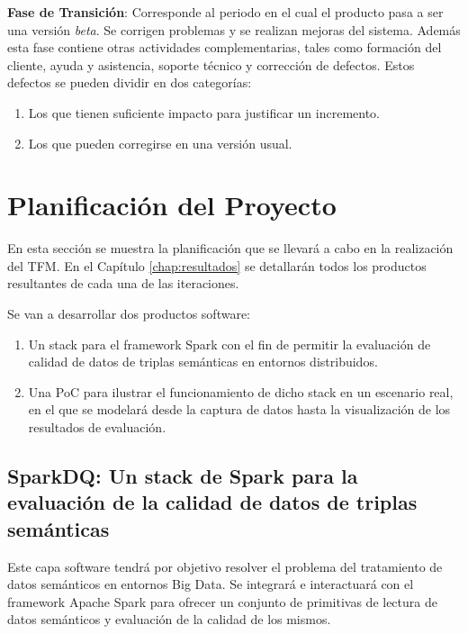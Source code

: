 \textbf{Fase de Transición}: Corresponde al periodo en el cual el producto pasa
a ser una versión \textit{beta}. Se corrigen problemas y se realizan mejoras del
sistema. Además esta fase contiene otras actividades complementarias, tales
como formación del cliente, ayuda y asistencia, soporte técnico y corrección de
defectos. Estos defectos se pueden dividir en dos categorías: 

\begin{enumerate}
\item Los que tienen suficiente impacto para justificar un incremento. 
\item Los que pueden corregirse en una versión usual. 
\end{enumerate}



\section{Planificación del Proyecto}

En esta sección se muestra la planificación que se llevará a cabo en la
realización del \acs{TFM}. En el Capítulo \ref{chap:resultados} se detallarán
todos los productos resultantes de cada una de las iteraciones. 

Se van a desarrollar dos productos software:

\begin{enumerate}
\item Un stack para el framework Spark con el fin de permitir la evaluación de
  calidad de datos de triplas semánticas en entornos distribuidos.
\item Una \acf{PoC} para ilustrar el funcionamiento de dicho stack en un
  escenario real, en el que se modelará desde la captura de datos hasta la
  visualización de los resultados de evaluación.
\end{enumerate}


\subsection{SparkDQ: Un stack de Spark para la evaluación de la calidad de datos
  de triplas semánticas} 

Este capa software tendrá por objetivo resolver el problema del tratamiento de
datos semánticos en entornos Big Data. Se integrará e interactuará con el
framework Apache Spark para ofrecer un conjunto de primitivas de lectura de
datos semánticos y evaluación de la calidad de los mismos.

